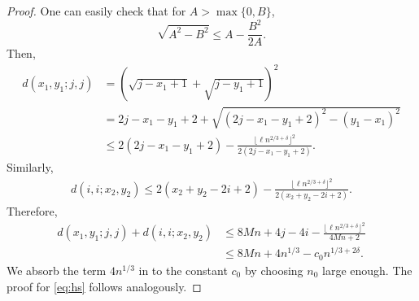 \documentclass[11pt]{article}
\theoremstyle{definition}
\begin{document}
\begin{proof}
    One can easily check that for $A > \max\{0,B\}$, 
    \[
    \sqrt{A^2 - B^2} \leq A - \frac{B^2}{2A}.
    \]
    Then,
    \[
    \begin{aligned}
    d(x_1,y_1;j,j) &= (\sqrt{j-x_1+1} + \sqrt{j-y_1+1})^2\\
    &= 2j - x_1 -y_1+2 + \sqrt{(2j-x_1-y_1+2)^2 - (y_1-x_1)^2}\\
    &\leq 2(2j-x_1-y_1+2) -\frac{\lfloor \ell n^{2/3 + \delta} \rfloor^2}{2(2j-x_1-y_1+2)}.
    \end{aligned}
    \]
    Similarly, 
    \[
    \begin{aligned}
    d(i,i;x_2,y_2) \leq 2(x_2+y_2 - 2i+2) -\frac{\lfloor \ell n^{2/3 + \delta} \rfloor^2}{2(x_2+y_2 - 2i+2)}.
    \end{aligned}
    \]
    Therefore,
    \[
    \begin{aligned}
    d(x_1,y_1;j,j) +d(i,i;x_2,y_2)  &\leq  8Mn +4j -4i -\frac{\lfloor \ell n^{2/3 + \delta} \rfloor^2}{4Mn+2}\\
    &\leq 8Mn + 4n^{1/3} - c_0 n^{1/3+2\delta}.
    \end{aligned}
    \]
    We absorb the term $4n^{1/3}$ in to the constant $c_0$ by choosing $n_0$ large enough. The proof for \eqref{eq:hs} follows analogously.
\end{proof}
\end{document}

